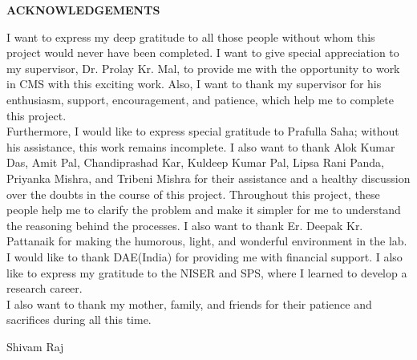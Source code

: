 \begin{center}
{\bf ACKNOWLEDGEMENTS}
\end{center}
I want to express my deep gratitude to all those people without whom this project would never have been completed. I want to give special appreciation to my supervisor, Dr. Prolay Kr. Mal, to provide me with the opportunity to work in CMS with this exciting work. Also, I want to thank my supervisor for his enthusiasm, support, encouragement, and patience, which help me to complete this project.\\
Furthermore, I would like to express special gratitude to Prafulla Saha; without his assistance, this work remains incomplete. I also want to thank Alok Kumar Das, Amit Pal, Chandiprashad Kar, Kuldeep Kumar Pal, Lipsa Rani Panda, Priyanka Mishra, and Tribeni Mishra for their assistance and a healthy discussion over the doubts in the course of this project. Throughout this project, these people help me to clarify the problem and make it simpler for me to understand the reasoning behind the processes. I also want to thank Er. Deepak Kr. Pattanaik for making the humorous, light, and wonderful environment in the lab.\\ 
I would like to thank DAE(India) for providing me with financial support. I also like to express my gratitude to the NISER and SPS, where I learned to develop a research career.\\
I also want to thank my mother, family, and friends for their patience and sacrifices during all this time.


 \begin{flushright}
 Shivam Raj 
 \end{flushright}                   


                                           

